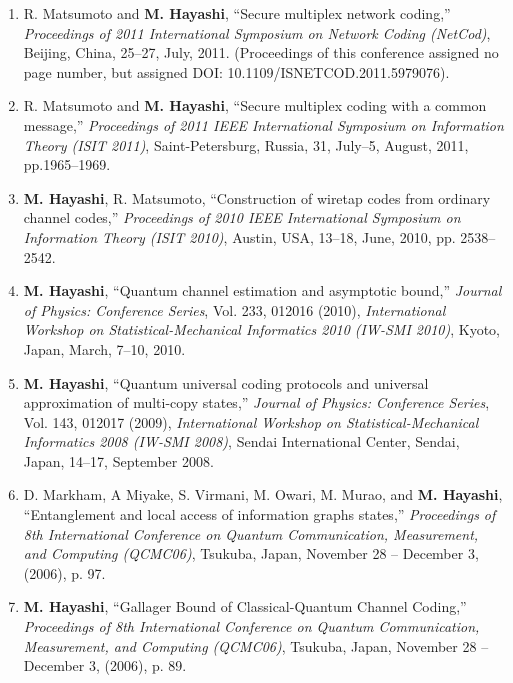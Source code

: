 \documentclass[a4paper,12pt,oneside]{article}
\begin{document}
\begin{enumerate}
\item   R. Matsumoto and \textbf{M. Hayashi}, 
``Secure multiplex network coding,'' 
{\em Proceedings of 2011 International Symposium on Network Coding (NetCod)}, 
Beijing, China, 25--27, July, 2011.
(Proceedings of this conference assigned no page number, but assigned DOI: 10.1109/ISNETCOD.2011.5979076).

\item R. Matsumoto and \textbf{M. Hayashi}, 
``Secure multiplex coding with a common message,'' 
{\em Proceedings of 2011 IEEE International Symposium on Information Theory (ISIT 2011)}, 
Saint-Petersburg, Russia, 31, July--5, August, 2011, pp.1965--1969.

\item   \textbf{M. Hayashi}, R. Matsumoto, 
``Construction of wiretap codes from ordinary channel codes,'' 
{\em Proceedings of 2010 IEEE International Symposium on Information Theory (ISIT 2010)}, 
Austin, USA, 13--18, June, 2010, pp. 2538--2542.

\item   \textbf{M. Hayashi}, 
``Quantum channel estimation and asymptotic bound,'' 
{\em Journal of Physics: Conference Series}, Vol. 233, 012016 (2010), 
{\em International Workshop on Statistical-Mechanical Informatics 2010 (IW-SMI 2010)}, 
Kyoto, Japan, March, 7--10, 2010.

\item   \textbf{M. Hayashi}, 
``Quantum universal coding protocols and universal approximation of multi-copy states,'' 
{\em Journal of Physics: Conference Series}, Vol. 143, 012017 (2009), 
{\em International Workshop on Statistical-Mechanical Informatics 2008 (IW-SMI 2008)}, 
Sendai International Center, Sendai, Japan, 14--17, September 2008.

\item
D. Markham, A Miyake, S. Virmani, M. Owari, M. Murao, and \textbf{M. Hayashi},
``Entanglement and local access of information graphs states,''
{\em Proceedings of 8th International Conference on Quantum 
Communication, Measurement, and Computing (QCMC06)},
Tsukuba, Japan, November 28 -- December 3, (2006), p. 97.

\item
\textbf{M. Hayashi},
``Gallager Bound of Classical-Quantum Channel Coding,''
{\em Proceedings of 8th International Conference on Quantum 
Communication, Measurement, and Computing (QCMC06)},
Tsukuba, Japan, November 28 -- December 3, (2006), p. 89.


\end{enumerate}
\end{document}
